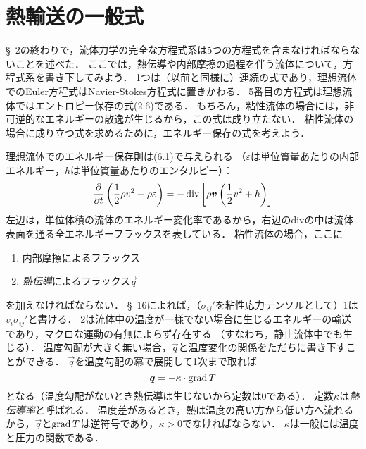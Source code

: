 \section{熱輸送の一般式}

\S~2の終わりで，流体力学の完全な方程式系は5つの方程式を含まなければならないことを述べた．
ここでは，熱伝導や内部摩擦の過程を伴う流体について，方程式系を書き下してみよう．
1つは（以前と同様に）連続の式であり，理想流体でのEuler方程式はNavier-Stokes方程式に置きかわる．
5番目の方程式は理想流体ではエントロピー保存の式(2.6)である．
もちろん，粘性流体の場合には，非可逆的なエネルギーの散逸が生じるから，この式は成り立たない．
粘性流体の場合に成り立つ式を求めるために，エネルギー保存の式を考えよう．


理想流体でのエネルギー保存則は(6.1)で与えられる
（$\varepsilon$は単位質量あたりの内部エネルギー，$h$は単位質量あたりのエンタルピー）：
\[
    \pdv{t} \left( \frac{1}{2}\rho v^2 + \rho\varepsilon \right)
    = -\operatorname{div} \left[ \rho \vb*{v} \left( \frac{1}{2}v^2 + h \right) \right]
\]
左辺は，単位体積の流体のエネルギー変化率であるから，右辺のdivの中は流体表面を通る全エネルギーフラックスを表している．
粘性流体の場合，ここに
\begin{enumerate}
    \item 内部摩擦によるフラックス
    \item \emph{熱伝導}によるフラックス$\vec{q}$
\end{enumerate}
を加えなければならない．
\S~16によれば，（$\sigma_{ij}'$を粘性応力テンソルとして）1は$v_i\sigma_{ij}'$と書ける．
2は流体中の温度が一様でない場合に生じるエネルギーの輸送であり，マクロな運動の有無によらず存在する
（すなわち，静止流体中でも生じる）．
温度勾配が大きく無い場合，$\vec{q}$と温度変化の関係をただちに書き下すことができる．
$\vec{q}$を温度勾配の冪で展開して1次まで取れば
\begin{equation}\label{eq49.1:Fourierの法則}
    \vb*{q} = -\kappa \cdot \operatorname{grad} T
\end{equation}
となる（温度勾配がないとき熱伝導は生じないから定数は0である）．
定数$\kappa$は\emph{熱伝導率}と呼ばれる．
温度差があるとき，熱は温度の高い方から低い方へ流れるから，$\vec{q}$と$\operatorname{grad} T$は逆符号であり，$\kappa>0$でなければならない．
$\kappa$は一般には温度と圧力の関数である．

